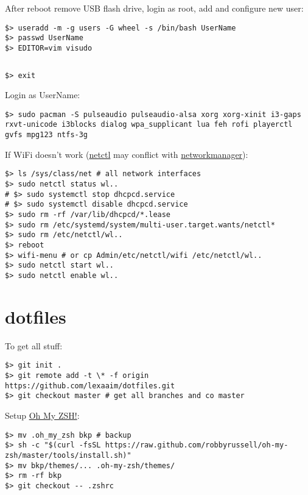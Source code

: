 \documentclass[a4paper, 12pt]{article}
\begin{document}
After reboot remove USB flash drive, login as root, add and configure new user:
\begin{lstlisting}
$> useradd -m -g users -G wheel -s /bin/bash UserName
$> passwd UserName
$> EDITOR=vim visudo
\end{lstlisting}

\begin{lstlisting}[style=style_file,caption={\path{sudoers} uncomment:}]
%wheel=ALL (ALL) ALL
\end{lstlisting}

\begin{lstlisting}
$> exit
\end{lstlisting}

Login as UserName:
\begin{lstlisting}
$> sudo pacman -S pulseaudio pulseaudio-alsa xorg xorg-xinit i3-gaps rxvt-unicode i3blocks dialog wpa_supplicant lua feh rofi playerctl gvfs mpg123 ntfs-3g
\end{lstlisting}

If WiFi doesn't work (\url{netctl} may conflict with \url{networkmanager}):
\begin{lstlisting}
$> ls /sys/class/net # all network interfaces
$> sudo netctl status wl..
# $> sudo systemctl stop dhcpcd.service
# $> sudo systemctl disable dhcpcd.service
$> sudo rm -rf /var/lib/dhcpcd/*.lease
$> sudo rm /etc/systemd/system/multi-user.target.wants/netctl*
$> sudo rm /etc/netctl/wl..
$> reboot
$> wifi-menu # or cp Admin/etc/netctl/wifi /etc/netctl/wl..
$> sudo netctl start wl..
$> sudo netctl enable wl..
\end{lstlisting}

\section{dotfiles}

To get all stuff:
\begin{lstlisting}
$> git init .
$> git remote add -t \* -f origin https://github.com/lexaaim/dotfiles.git
$> git checkout master # get all branches and co master
\end{lstlisting}

Setup \url{Oh My ZSH!}:
\begin{lstlisting}
$> mv .oh_my_zsh bkp # backup
$> sh -c "$(curl -fsSL https://raw.github.com/robbyrussell/oh-my-zsh/master/tools/install.sh)"
$> mv bkp/themes/... .oh-my-zsh/themes/
$> rm -rf bkp
$> git checkout -- .zshrc
\end{lstlisting}
\end{document}
